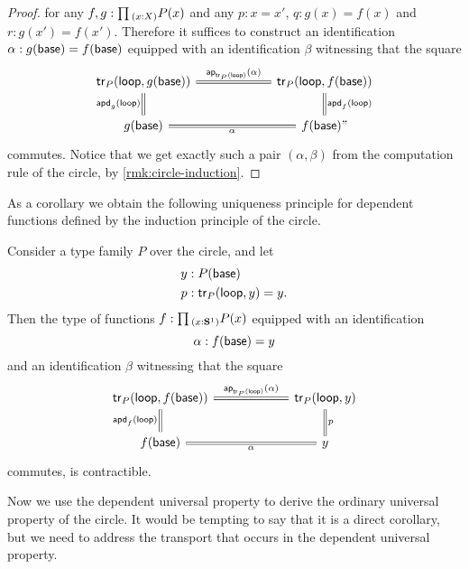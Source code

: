 \begin{proof}
  for any $f,g:\prd{x:X}P(x)$ and any $p:x=x'$, $q:g(x)=f(x)$ and $r:g(x')=f(x')$.
  Therefore it suffices to construct an identification $\alpha:g(\mathsf{base})=f(\mathsf{base})$ equipped with an identification $\beta$ witnessing that the square
  \begin{equation*}
    \begin{tikzcd}[column sep=6em]
      \tr_P(\lloop,g(\base)) \arrow[d,equals,swap,"\apd{g}{\lloop}"] \arrow[r,equals,"\ap{\tr_P(\lloop)}{\alpha}"] & \tr_P(\lloop,f(\base)) \arrow[d,equals,"\apd{f}{\lloop}"] \\
      g(\base) \arrow[r,equals,swap,"\alpha"] & f(\base)"
    \end{tikzcd}
  \end{equation*}
  commutes. Notice that we get exactly such a pair $(\alpha,\beta)$ from the computation rule of the circle, by \cref{rmk:circle-induction}.
\end{proof}

As a corollary we obtain the following uniqueness principle for dependent functions defined by the induction principle of the circle.

\begin{cor}
  Consider a type family $P$ over the circle, and let
  \begin{align*}
    y & : P(\mathsf{base}) \\
    p & : \mathsf{tr}_{P}(\mathsf{loop},y)=y.
  \end{align*}
  Then the type of functions $f:\prd{x:\sphere{1}}P(x)$ equipped with an identification
  \begin{equation*}
    \alpha: f(\mathsf{base})=y
  \end{equation*}
  and an identification $\beta$ witnessing that the square
  \begin{equation*}
    \begin{tikzcd}[column sep=6em]
      \tr_P(\lloop,f(\base)) \arrow[d,equals,swap,"{\apd{f}{\lloop}}"] \arrow[r,equals,"\ap{\tr_P(\lloop)}{\alpha}"] & \tr_P(\lloop,y) \arrow[d,equals,"{p}"] \\
      f(\base) \arrow[r,equals,swap,"\alpha"] & y
    \end{tikzcd}
  \end{equation*}
  commutes, is contractible.
\end{cor}

Now we use the dependent universal property to derive the ordinary universal property of the circle. It would be tempting to say that it is a direct corollary, but we need to address the transport that occurs in the dependent universal property.

